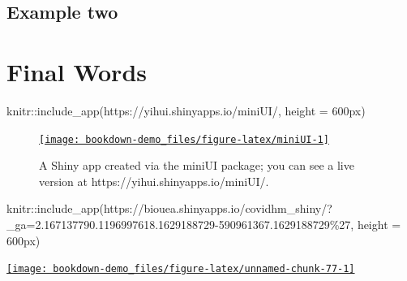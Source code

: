 \documentclass[
]{book}
\newenvironment{Shaded}{\begin{snugshade}}{\end{snugshade}}
\newcommand{\AttributeTok}[1]{\textcolor[rgb]{0.77,0.63,0.00}{#1}}
\newcommand{\FunctionTok}[1]{\textcolor[rgb]{0.00,0.00,0.00}{#1}}
\newcommand{\NormalTok}[1]{#1}
\newcommand{\SpecialCharTok}[1]{\textcolor[rgb]{0.00,0.00,0.00}{#1}}
\newcommand{\StringTok}[1]{\textcolor[rgb]{0.31,0.60,0.02}{#1}}
\begin{document}
\hypertarget{example-two}{%
\section{Example two}\label{example-two}}

\hypertarget{final-words}{%
\chapter{Final Words}\label{final-words}}

\begin{Shaded}
\begin{Highlighting}[]
\NormalTok{knitr}\SpecialCharTok{::}\FunctionTok{include\_app}\NormalTok{(}\StringTok{\textquotesingle{}https://yihui.shinyapps.io/miniUI/\textquotesingle{}}\NormalTok{, }\AttributeTok{height =} \StringTok{\textquotesingle{}600px\textquotesingle{}}\NormalTok{)}
\end{Highlighting}
\end{Shaded}

\begin{figure}

{\centering \href{https://yihui.shinyapps.io/miniUI/}{\texttt{[image: bookdown-demo\_files/figure-latex/miniUI-1]} }

}

\caption{A Shiny app created via the miniUI package; you can see a live version at https://yihui.shinyapps.io/miniUI/.}\label{fig:miniUI}
\end{figure}

\begin{Shaded}
\begin{Highlighting}[]
\NormalTok{knitr}\SpecialCharTok{::}\FunctionTok{include\_app}\NormalTok{(}\StringTok{\textquotesingle{}https://biouea.shinyapps.io/covidhm\_shiny/?\_ga=2.167137790.1196997618.1629188729{-}590961367.1629188729\%27\textquotesingle{}}\NormalTok{, }\AttributeTok{height =} \StringTok{\textquotesingle{}600px\textquotesingle{}}\NormalTok{)}
\end{Highlighting}
\end{Shaded}

\begin{center}\href{https://biouea.shinyapps.io/covidhm_shiny/?_ga=2.167137790.1196997618.1629188729-590961367.1629188729%27}{\texttt{[image: bookdown-demo\_files/figure-latex/unnamed-chunk-77-1]} }\end{center}

  
\end{document}
